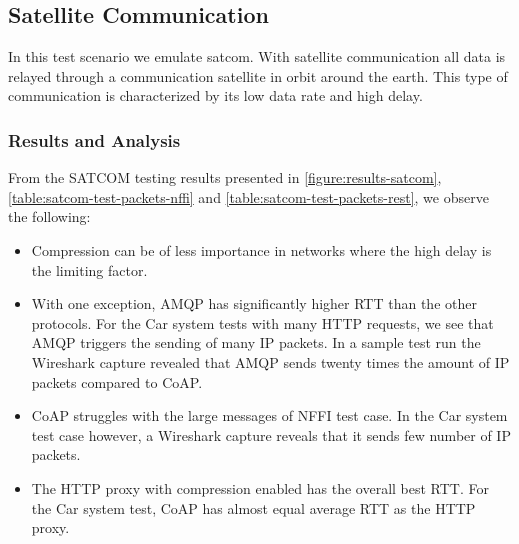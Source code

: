 \subsection{Satellite Communication}

In this test scenario we emulate \gls{satcom}. With satellite communication
all data is relayed through a communication satellite in orbit around
the earth. This type of communication is characterized by its low data rate
and high delay.

\subsubsection{Results and Analysis}

From the SATCOM testing results presented in \cref{figure:results-satcom},
\cref{table:satcom-test-packets-nffi} and \cref{table:satcom-test-packets-rest},
we observe the following:

\begin{itemize}

    \item Compression can be of less importance in networks where the high delay
    is the limiting factor.

    \item With one exception, AMQP has significantly higher RTT than the other
    protocols. For the Car system tests with many HTTP requests, we see that
    AMQP triggers the sending of many IP packets. In a sample test run the
    Wireshark capture revealed that AMQP sends twenty times the amount of IP packets
    compared to CoAP.

    \item CoAP struggles with the large messages of NFFI test case. In the Car
    system test case however, a Wireshark capture reveals that it sends few number of IP
    packets.

    \item The HTTP proxy with compression enabled has the overall best RTT. For
    the Car system test, CoAP has almost equal average RTT as the HTTP proxy.

\end{itemize}

